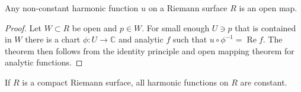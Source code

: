 \begin{theorem}
    Any non-constant harmonic function $u$ on a Riemann surface $R$ is an open map.
\end{theorem}
\begin{proof}
    Let $W\subset R$ be open and $p\in W$.
    For small enough $U\ni p$ that is contained in $W$ there is a chart $\phi:U\to\mathbb C$ and analytic $f$ such that $u\circ\phi^{-1}=\operatorname{Re}f$.
    The theorem then follows from the identity principle and open mapping theorem for analytic functions.
\end{proof}
\begin{corollary}
    If $R$ is a compact Riemann surface, all harmonic functions on $R$ are constant.
\end{corollary}

